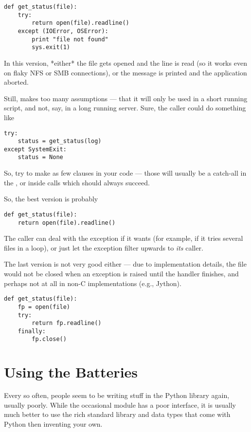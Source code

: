 \documentclass{howto}
\begin{document}
\begin{verbatim}
def get_status(file):
    try:
        return open(file).readline()
    except (IOError, OSError):
        print "file not found"
        sys.exit(1)
\end{verbatim}

In this version, *either* the file gets opened and the line is read
(so it works even on flaky NFS or SMB connections), or the message
is printed and the application aborted.

Still,  makes too many assumptions --- that it
will only be used in a short running script, and not, say, in a long
running server. Sure, the caller could do something like

\begin{verbatim}
try:
    status = get_status(log)
except SystemExit:
    status = None
\end{verbatim}

So, try to make as few  clauses in your code --- those will
usually be a catch-all in the , or inside calls which
should always succeed.

So, the best version is probably

\begin{verbatim}
def get_status(file):
    return open(file).readline()
\end{verbatim}

The caller can deal with the exception if it wants (for example, if it 
tries several files in a loop), or just let the exception filter upwards
to {\em its} caller.

The last version is not very good either --- due to implementation details,
the file would not be closed when an exception is raised until the handler
finishes, and perhaps not at all in non-C implementations (e.g., Jython).

\begin{verbatim}
def get_status(file):
    fp = open(file)
    try:
        return fp.readline()
    finally:
        fp.close()
\end{verbatim}

\section{Using the Batteries}

Every so often, people seem to be writing stuff in the Python library
again, usually poorly. While the occasional module has a poor interface,
it is usually much better to use the rich standard library and data
types that come with Python then inventing your own.
\end{document}
